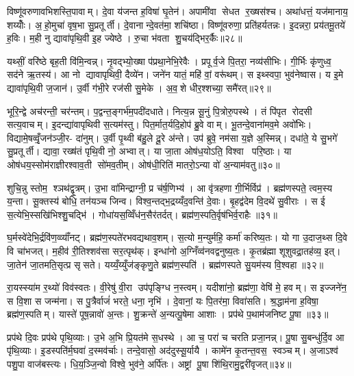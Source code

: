 विष्णू॑वरुणावभिशस्ति॒पावाम्। दे॒वा य॑जन्त ह॒विषा॑ घृ॒तेन॑। अपामी॑वा सेधत र॒ख्षस॑श्च। अथा॑धत्तं॒ यज॑मानाय॒ शय्योँः। अ॒हो॒मुचा॑ वृष॒भा सु॒प्रतूर्ती। दे॒वानान्दे॒वत॑मा॒ शचि॑ष्ठा। विष्णू॑वरुणा॒ प्रति॑हर्यतन्नः। इ॒दन्नरा॒ प्रय॑तमू॒तये॑ ह॒विः। म॒ही नु द्यावा॑पृथि॒वी इ॒ह ज्येष्ठे। रु॒चा भ॑वता शु॒चय॑द्भिर॒र्कैः॥२८॥

यथ्सीं॒ वरि॑ष्ठे बृह॒ती वि॑मि॒न्वन्न्। नृ॒वद्भ्यो॒ख्षा प॑प्रथा॒नेभि॒रेवैः। प्रपूर्व॒जे पि॒तरा॒ नव्य॑सीभिः। गी॒र्भिः कृ॑णुध्व॒ सद॑ने ऋ॒तस्य॑। आ नो द्यावापृथिवी॒ दैव्ये॑न। जने॑न यातं॒ महि॑ वां॒ वरू॑थम्। स इथ्स्वपा॒ भुव॑नेष्वास। य इ॒मे द्यावा॑पृथि॒वी ज॒जान॑। उ॒र्वी ग॑भी॒रे रज॑सी सु॒मेके। अ॒व॒शे धीर॒श्शच्या॒ समै॑रत्॥२९॥

भूरि॒न्द्वे अच॑रन्ती॒ चर॑न्तम्। प॒द्वन्त॒ङ्गर्भ॑म॒पदी॑दधाते। नित्य॒न्न सू॒नुं पि॒त्रोरु॒पस्थे। तं पि॑पृत रोदसी सत्य॒वाचम्। इ॒दन्द्या॑वापृथिवी स॒त्यम॑स्तु। पित॒र्मात॒र्यदि॒होप॑ ब्रु॒वे वाम्। भू॒तन्दे॒वाना॑मव॒मे अवो॑भिः। विद्यामे॒षव्वृँ॒जन॑ञ्जी॒र- दा॑नुम्। उ॒र्वी पृ॒थ्वी ब॑हु॒ले दू॒रे अ॑न्ते। उप॑ ब्रुवे॒ नम॑सा य॒ज्ञे अ॒स्मिन्न्। दधा॑ते॒ ये सु॒भगे॑ सु॒प्रतूर्ती। द्यावा॒ रख्ष॑तं पृथि॒वी नो॒ अभ्वात्। या जा॒ता ओष॑ध॒योऽति॒ विश्वा परि॒ष्ठाः। या ओष॑धय॒स्सोम॑राज्ञीरश्वाव॒ती सो॑मव॒तीम्। ओष॑धी॒रिति॑ मातरो॒ऽन्या वो॑ अ॒न्याम॑वतु॥३०॥\anuvakamend[ह॒विर्नो॑ दाद्भभूव रा॒तिं पू॒र्वहू॑ताव॒र्कैरै॑रद॒स्मिन्पञ्च॑ च]

शुचि॒न्नु स्तोम॒ श्ञथ॑द्वृ॒त्रम्। उ॒भा वा॑मिन्द्राग्नी॒ प्र च॑र्\mbox{}ष॒णिभ्य॑। आ वृ॑त्रहणा गी॒र्भिर्विप्र॑। ब्रह्म॑णस्पते॒ त्वम॒स्य य॒न्ता। सू॒क्तस्य॑ बोधि॒ तन॑यञ्च जिन्व। विश्व॒न्तद्भ॒द्रय्यँद॒वन्ति॑ दे॒वाः। बृ॒हद्व॑देम वि॒दथे॑ सु॒वीराः। स ई स॒त्येभि॒स्सखि॑भिश्शु॒चद्भि॑। गोधा॑यस॒व्विँध॑न॒सैर॑तर्दत्। ब्रह्म॑ण॒स्पति॒र्वृष॑भिर्व॒राहैः॥३१॥

घ॒र्मस्वे॑देभि॒र्द्रवि॑ण॒व्व्याँ॑नट्। ब्रह्म॑ण॒स्पते॑रभवद्यथाव॒शम्। स॒त्यो म॒न्युर्महि॒ कर्मा॑ करिष्य॒तः। यो गा उ॒दाज॒थ्स दि॒वे वि चा॑भजत्। म॒हीव॑ री॒तिश्शव॑सा सर॒त्पृथ॑क्। इन्धा॑नो अ॒ग्निँव्व॑नवद्वनुष्य॒तः। कृ॒तब्र॑ह्मा शूशुवद्रा॒तह॑व्य॒ इत्। जा॒तेन॑ जा॒तमति॒सृत्प्र सृसते। यय्यँ॒य्युँज॑ङ्कृणु॒ते ब्रह्म॑ण॒स्पति॑। ब्रह्म॑णस्पते सु॒यम॑स्य वि॒श्वहा॥३२॥

रा॒यस्स्या॑म र॒थ्यो॑ विव॑स्वतः। वी॒रेषु॑ वी॒रा उप॑पृङ्ग्धि न॒स्त्वम्। यदीशा॑नो॒ ब्रह्म॑णा॒ वेषि॑ मे॒ हवम्। स इज्जने॑न॒ स वि॒शा स जन्म॑ना। स पु॒त्रैर्वाजं॑ भरते॒ धना॒ नृभि॑। दे॒वानां॒ यः पि॒तर॑मा॒ विवा॑सति। श्र॒द्धाम॑ना ह॒विषा॒ ब्रह्म॑ण॒स्पतिम्। यास्ते॑ पूष॒न्नावो॑ अ॒न्तः। शु॒क्रन्ते॑ अ॒न्यत्पू॒षेमा आशाः। प्रप॑थे प॒थाम॑जनिष्ट पू॒षा ॥३३॥

प्रप॑थे दि॒वः प्रप॑थे पृथि॒व्याः। उ॒भे अ॒भि प्रि॒यत॑मे स॒धस्थे। आ च॒ परा॑ च चरति प्रजा॒नन्न्। पू॒षा सु॒बन्धु॑र्दि॒व आ पृ॑थि॒व्याः। इ॒डस्पति॑र्म॒घवा॑ द॒स्मव॑र्चाः। तन्दे॒वासो॒ अद॑दुस्सू॒र्यायै। कामे॑न कृ॒तन्त॒वस॒ स्वञ्चम्। अ॒जाऽश्व॑ पशु॒पा वाज॑बस्त्यः। धि॒य॒ञ्जि॒न्वो विश्वे॒ भुव॑ने॒ अर्पि॑तः। अष्ट्रां पू॒षा शि॑थि॒रामु॒द्वरी॑वृजत्॥३४॥

